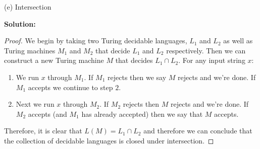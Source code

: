 \documentclass[11pt]{article}
\begin{document}
\begin{enumerate}
(e) Intersection

\textbf{Solution: }\begin{proof}
We begin by taking two Turing decidable languages, $L_1$ and $L_2$ as well as Turing machines $M_1$ and $M_2$ that decide $L_1$ and $L_2$ respectively.  Then we can construct a new Turing machine $M$ that decides $L_1 \cap L_2$.  For any input string $x$:
\begin{enumerate}
\item We run $x$ through $M_1$.  If $M_1$ rejects then we say $M$ rejects and we're done.  If $M_1$ accepts we continue to step $2$.  
\item Next we run $x$ through $M_2$.  If $M_2$ rejects then $M$ rejects and we're done.  If $M_2$ accepts (and $M_1$ has already accepted) then we say that $M$ accepts.  
\end{enumerate}
Therefore, it is clear that $L(M) = L_1 \cap L_2$ and therefore we can conclude that the collection of decidable languages is closed under intersection.  
\end{proof}


\end{enumerate}
\end{document}
